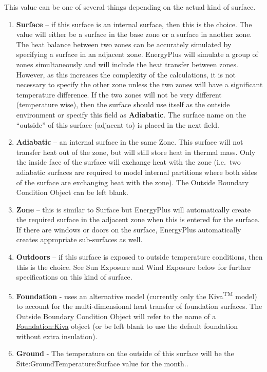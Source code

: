 This value can be one of several things depending on the actual kind of surface.

\begin{enumerate}
  \item
    \textbf{Surface} -- if this surface is an internal surface, then this is the choice. The value will either be a surface in the base zone or a surface in another zone. The heat balance between two zones can be accurately simulated by specifying a surface in an adjacent zone. EnergyPlus will simulate a group of zones simultaneously and will include the heat transfer between zones. However, as this increases the complexity of the calculations, it is not necessary to specify the other zone unless the two zones will have a significant temperature difference. If the two zones will not be very different (temperature wise), then the surface should use itself as the outside environment or specify this field as \textbf{Adiabatic}. The surface name on the ``outside'' of this surface (adjacent to) is placed in the next field.
  \item
    \textbf{Adiabatic} -- an internal surface in the same Zone. This surface will not transfer heat out of the zone, but will still store heat in thermal mass. Only the inside face of the surface will exchange heat with the zone (i.e.~two adiabatic surfaces are required to model internal partitions where both sides of the surface are exchanging heat with the zone). The Outside Boundary Condition Object can be left blank.
  \item
    \textbf{Zone} -- this is similar to Surface but EnergyPlus will automatically create the required surface in the adjacent zone when this is entered for the surface. If there are windows or doors on the surface, EnergyPlus automatically creates appropriate sub-surfaces as well.
  \item
    \textbf{Outdoors} -- if this surface is exposed to outside temperature conditions, then this is the choice. See Sun Exposure and Wind Exposure below for further specifications on this kind of surface.
  \item
    \textbf{Foundation} - uses an alternative model (currently only the Kiva\textsuperscript{TM} model) to account for the multi-dimensional heat transfer of foundation surfaces. The Outside Boundary Condition Object will refer to the name of a \hyperref[foundationkiva]{Foundation:Kiva} object (or be left blank to use the default foundation without extra insulation).
  \item
    \textbf{Ground} - The temperature on the outside of this surface will be the Site:GroundTemperature:Surface value for the month..

\end{enumerate}
